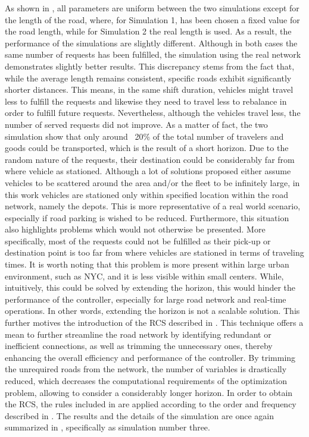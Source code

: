 As shown in , all parameters are uniform between the two simulations except for the length of the road, where, for Simulation 1, has been chosen a fixed value for the road length, while for Simulation 2 the real length is used. As a result, the performance of the simulations are slightly different. Although in both cases the same number of requests has been fulfilled, the simulation using the real network demonstrates slightly better results. This discrepancy stems from the fact that, while the average length remains consistent, specific roads exhibit significantly shorter distances. This means, in the same shift duration, vehicles might travel less to fulfill the requests and likewise they need to travel less to rebalance in order to fulfill future requests. Nevertheless, although the vehicles travel less, the number of served requests did not improve. As a matter of fact, the two simulation show that only around ~20\% of the total number of travelers and goods could be transported, which is the result of a short horizon. Due to the random nature of the requests, their destination could be considerably far from where vehicle as stationed. Although a lot of solutions proposed either assume vehicles to be scattered around the area and/or the fleet to be infinitely large, in this work vehicles are stationed only within specified location within the road network, namely the depots. This is more representative of a real world scenario, especially if road parking is wished to be reduced. Furthermore, this situation also highlights problems which would not otherwise be presented. More specifically, most of the requests could not be fulfilled as their pick-up or destination point is too far from where vehicles are stationed in terms of traveling times. It is worth noting that this problem is more present within large urban environment, such as NYC, and it is less visible within small centers. While, intuitively, this could be solved by extending the horizon, this would hinder the performance of the controller, especially for large road network and real-time operations. In other words, extending the horizon is not a scalable solution. This further motives the introduction of the RCS described in . This technique offers a mean to further streamline the road network by identifying redundant or inefficient connections, as well as trimming the unnecessary ones, thereby enhancing the overall efficiency and performance of the controller. By trimming the unrequired roads from the network, the number of variables is drastically reduced, which decreases the computational requirements of the optimization problem, allowing to consider a considerably longer horizon. In order to obtain the RCS, the rules included in  are applied according to the order and frequency described in . The results and the details of the simulation are once again summarized in , specifically as simulation number three.
